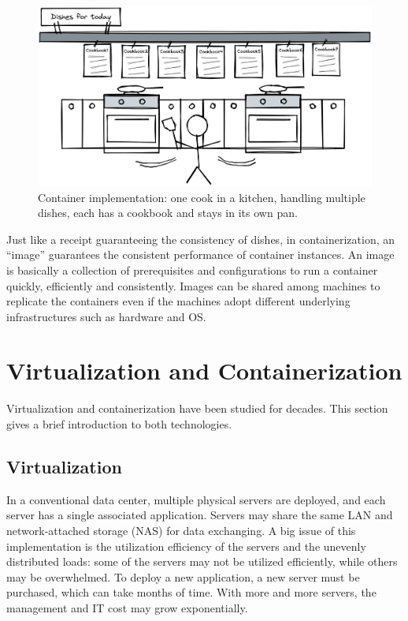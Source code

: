\begin{figure}[htbp]
	\centering
	\includegraphics[width=350pt]{chapters/part-3/figures/multitaskcook.png}
	\caption{Container implementation: one cook in a kitchen, handling multiple dishes, each has a cookbook and stays in its own pan.} \label{ch:vac:fig:multitaskcook}
\end{figure}

Just like a receipt guaranteeing the consistency of dishes, in containerization, an ``image'' guarantees the consistent performance of container instances. An image is basically a collection of prerequisites and configurations to run a container quickly, efficiently and consistently. Images can be shared among machines to replicate the containers even if the machines adopt different underlying infrastructures such as hardware and OS.

\section{Virtualization and Containerization}

Virtualization and containerization have been studied for decades. This section gives a brief introduction to both technologies.

\subsection{Virtualization}

In a conventional data center, multiple physical servers are deployed, and each server has a single associated application. Servers may share the same LAN and network-attached storage (NAS) for data exchanging. A big issue of this implementation is the utilization efficiency of the servers and the unevenly distributed loads: some of the servers may not be utilized efficiently, while others may be overwhelmed. To deploy a new application, a new server must be purchased, which can take months of time. With more and more servers, the management and IT cost may grow exponentially.

